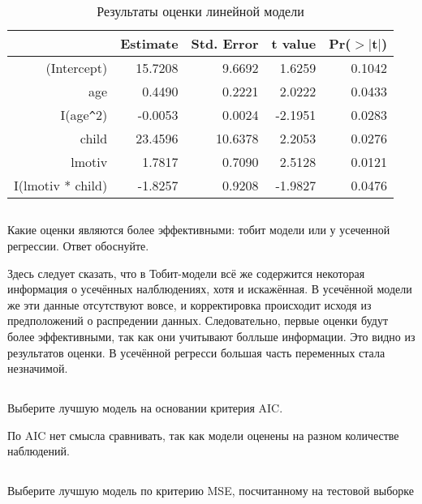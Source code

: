 \documentclass[a4paper,12pt]{article}
\begin{document}
\begin{table}[ht]
	\centering
	\begin{tabular}{|rrrrr|}
		\hline
		& Estimate & Std. Error & t value & Pr($>$$|$t$|$) \\ 
		\hline
(Intercept) & 15.7208 & 9.6692 & 1.6259 & 0.1042 \\ 
age & 0.4490 & 0.2221 & 2.0222 & 0.0433 \\ 
I(age\verb|^|2) & -0.0053 & 0.0024 & -2.1951 & 0.0283 \\ 
child & 23.4596 & 10.6378 & 2.2053 & 0.0276 \\ 
lmotiv & 1.7817 & 0.7090 & 2.5128 & 0.0121 \\ 
I(lmotiv * child) & -1.8257 & 0.9208 & -1.9827 & 0.0476 \\ 
		\hline
	\end{tabular}
\caption{Результаты оценки линейной модели}
\end{table}



\subsection{}

\Sun Какие оценки являются более эффективными: тобит модели или у усеченной
регрессии. Ответ обоснуйте.

Здесь следует сказать, что в Тобит-модели всё же содержится некоторая информация о усечённых налблюдениях, хотя и искажённая. В усечённой модели же эти данные отсутствуют вовсе, и корректировка происходит исходя из предположений о распредении данных. Следовательно, первые оценки будут более эффективными, так как они учитывают болльше информации. Это видно из результатов оценки. В усечённой регресси большая часть переменных стала незначимой.

\subsection{}
\Sun Выберите лучшую модель на основании критерия AIC.

По AIC нет смысла сравнивать, так как модели оценены на разном количестве наблюдений.

\subsection{}

\Sun Выберите лучшую модель по критерию MSE, посчитанному на тестовой
выборке
\end{document}
